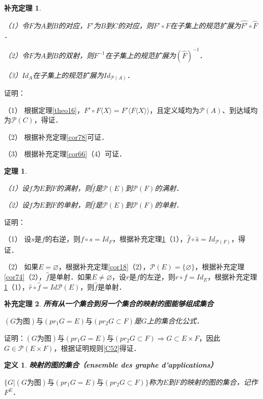 \documentclass[12pt, a4paper, oneside]{book}
\newtheorem{theo}{定理}
\newtheorem{cor}{补充定理}
\newtheorem{de}{定义}
\begin{document}
			\begin{cor}\label{cor119}
				\hfill\par
				（1）令$F$为$A$到$B$的对应，$F'$为$B$到$C$的对应，则$F'\circ F$在子集上的规范扩展为$\hat{F'}\circ \hat{F}$ ．
				\par
				（2）令$F$为$A$到$B$的双射，则$F^{-1}$在子集上的规范扩展为$(\hat{F})^{-1}$．
				\par
				（3）$Id_A$在子集上的规范扩展为$Id_{\mathcal{P}(A)}$．			
			\end{cor}
			证明：
			\par
			（1）	根据定理\ref{theo16}，$F'\circ 	F\langle X \rangle =F'\langle F\langle X \rangle \rangle$，且定义域均为$\mathcal{P}(A)$、到达域均为$\mathcal{P}(C)$，得证．
			\par
			（2）	根据补充定理\ref{cor78}可证．
			\par
			（3）	根据补充定理\ref{cor66}（4）可证．
									
			\begin{theo}\label{theo36}
				\hfill\par
				（1）设$f$为$E$到$F$的满射，则$\hat{f}$是$\mathcal{P}(E)$到$\mathcal{P}(F)$的满射．
				\par
				（2）设$f$为$E$到$F$的单射，则$\hat{f}$是$\mathcal{P}(E)$到$\mathcal{P}(F)$的单射．
			\end{theo}
			证明：
			\par
			（1）	设$s$是$f$的右逆，则$f\circ s=Id_F$，根据补充定理\ref{cor119}（1），$\hat{f}\circ \hat{s}=Id_{\mathcal{P}(F)}$，得证．
			\par
			（2）	如果$E=\varnothing$，根据补充定理\ref{cor18}（2），$\mathcal{P}(E) =\{\varnothing\}$，根据补充定理\ref{cor74}（2），$\hat{f}$是单射．如果$E\neq \varnothing$，设$r$是$f$的左逆，则$r\circ f=Id_E$，根据补充定理\ref{cor119}（1），$\hat{r}\circ \hat{f} =Id \mathcal{P}(E)$，则$\hat{f}$是单射．
			
			\begin{cor}\label{cor120}
				\textbf{所有从一个集合到另一个集合的映射的图能够组成集合}
				\par
				$(G\text{为图})\text{与}(pr_1G=E)\text{与}(pr_2G\subset F)$是$G$上的集合化公式．
			\end{cor}
			证明：$(G\text{为图})\text{与}(pr_1G=E)\text{与}(pr_2G\subset F)\Rightarrow G\subset E\times F$，因此$G\in \mathcal{P}(E\times F)$，根据证明规则\ref{C52}得证．

			\begin{de}
				\textbf{映射的图的集合（ensemble des graphe d'applications）}
				\par
				$\{G|(G\text{为图})\text{与}(pr_1G=E)\text{与}(pr_2G\subset F)\}$称为$E$到$F$的映射的图的集合，记作$F^E$．			
			\end{de}
			
\end{document}
